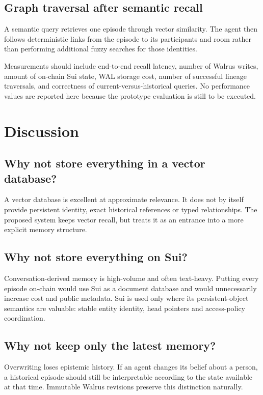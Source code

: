 \documentclass[11pt]{article}
\begin{document}
\subsection{Graph traversal after semantic recall}
A semantic query retrieves one episode through vector similarity. The agent then follows deterministic links from the episode to its participants and room rather than performing additional fuzzy searches for those identities.

Measurements should include end-to-end recall latency, number of Walrus writes, amount of on-chain Sui state, WAL storage cost, number of successful lineage traversals, and correctness of current-versus-historical queries. No performance values are reported here because the prototype evaluation is still to be executed.

\section{Discussion}

\subsection{Why not store everything in a vector database?}

A vector database is excellent at approximate relevance. It does not by itself provide persistent identity, exact historical references or typed relationships. The proposed system keeps vector recall, but treats it as an entrance into a more explicit memory structure.

\subsection{Why not store everything on Sui?}

Conversation-derived memory is high-volume and often text-heavy. Putting every episode on-chain would use Sui as a document database and would unnecessarily increase cost and public metadata. Sui is used only where its persistent-object semantics are valuable: stable entity identity, head pointers and access-policy coordination.

\subsection{Why not keep only the latest memory?}

Overwriting loses epistemic history. If an agent changes its belief about a person, a historical episode should still be interpretable according to the state available at that time. Immutable Walrus revisions preserve this distinction naturally.
\end{document}
